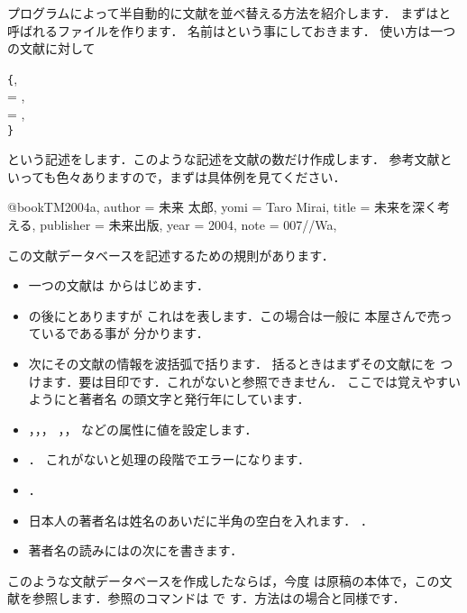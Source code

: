 プログラムによって半自動的に文献を並べ替える方法を紹介します．
まずはと呼ばれるファイルを作ります．
名前はという事にしておきます．
使い方は一つの文献に対して
\begin{Syntax}
\str@{}\verb|{|\str,\\
\quad   {} \str= \str,\\
\quad   {} \str= \str, \\
\verb|}|
\end{Syntax}
という記述をします．このような記述を文献の数だけ作成します．
参考文献といっても色々ありますので，まずは具体例を見てください．
\begin{InText}
@book{TM2004a,
author    = {未来 太郎},
yomi      = {Taro Mirai},
title     = {未来を深く考える},
publisher = {未来出版},
year      = {2004},
note      = {007//Wa},
}
\end{InText}
この文献データベースを記述するための規則があります．
\begin{itemize}
 \item 一つの文献は からはじめます．

 \item \qu{\str@}の後にとありますが
       これはを表します．この場合は一般に
       本屋さんで売っているである事が
       分かります．

%
 \item 次にその文献の情報を{波括弧}で括ります．
       括るときはまずその文献にを
       つけます．要は目印です．これがないと参照できません．
       ここでは覚えやすいようにと著者名
       の頭文字と発行年にしています．

 \item {}，，，
       ，，
       などの属性に値を設定します．

 \item {}．
       これがないと処理の段階でエラーになります．

 \item {}．

 \item 日本人の著者名は姓名のあいだに半角の空白を入れます．
       ．

 \item 著者名の読みにはの次にを書きます．
\end{itemize}
このような文献データベースを作成したならば，今度
は原稿の本体で，この文献を参照します．参照のコマンドは  で
す．方法はの場合と同様です．

